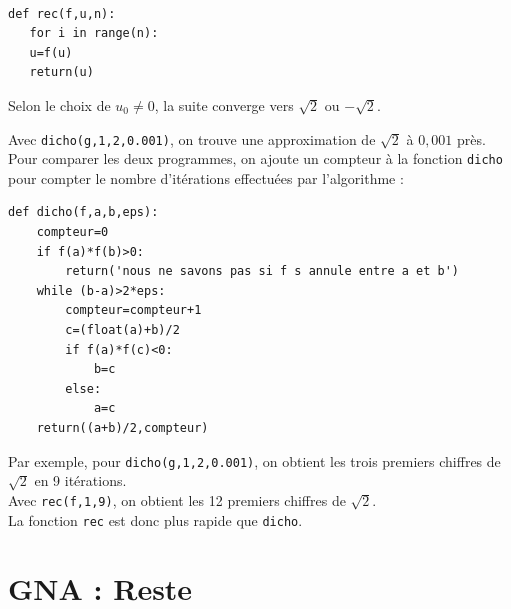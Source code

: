 \begin{solution}~\\
\vspace*{-0.7cm}
\begin{verbatim}
def rec(f,u,n):
   for i in range(n):
   u=f(u)
   return(u)
\end{verbatim}
\end{solution}


\begin{solution}
Selon le choix de $u_0\neq 0$, la suite converge vers $\sqrt{2}$ ou $-\sqrt{2}$.
\end{solution}


\begin{solution}
Avec \verb?dicho(g,1,2,0.001)?, on trouve une approximation de $\sqrt{2}$ \` a $0,001$ pr\` es.\\
Pour comparer les deux programmes, on ajoute un compteur \` a la fonction \verb?dicho? pour compter le nombre d'it\' erations effectu\' ees par l'algorithme :
\begin{verbatim}
def dicho(f,a,b,eps):
	compteur=0               
    if f(a)*f(b)>0:
        return('nous ne savons pas si f s annule entre a et b')
    while (b-a)>2*eps:
    	compteur=compteur+1
        c=(float(a)+b)/2
        if f(a)*f(c)<0:
            b=c
        else:
            a=c    
    return((a+b)/2,compteur)
\end{verbatim}
Par exemple, pour \verb?dicho(g,1,2,0.001)?, on obtient les trois premiers chiffres de $\sqrt{2}$ en 9 it\' erations. \\
Avec \verb?rec(f,1,9)?, on obtient les 12 premiers chiffres de $\sqrt{2}$.\\
La fonction \verb?rec? est donc plus rapide que \verb?dicho?.
\end{solution}




























\section{GNA : Reste}


